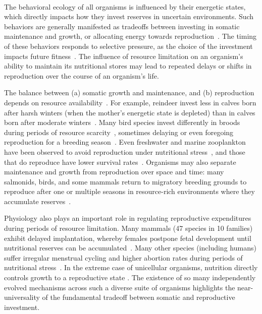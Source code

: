 \documentclass[twocolumn,preprintnumbers,amsmath,amssymb,superscriptaddress]{revtex4}
\begin{document}
\maketitle



\\
The behavioral ecology of all organisms is influenced by their energetic
states, which directly impacts how they invest reserves in uncertain
environments.  Such behaviors are generally manifested as tradeoffs between
investing in somatic maintenance and growth, or allocating energy towards
reproduction~\citep{Martin:1987dl,Kirk:1997cc,Kempes:2012hy}.  The timing of
these behaviors responds to selective pressure, as the choice of the
investment impacts future
fitness~\citep{Mangel:1988uaa,Mangel:2014kz,Yeakel:2013hi}.  The influence of
resource limitation on an organism's ability to maintain its nutritional
stores may lead to repeated delays or shifts in reproduction over the course
of an organism's life.

The balance between (a) somatic growth and maintenance, and (b) reproduction depends on resource availability~\citep{Morris:1987eo}.
For example, reindeer invest less in calves born after harsh winters (when the mother's energetic state is depleted) than in calves born after moderate winters~\citep{Tveraa:2003fq}.
Many bird species invest differently in broods during periods of resource scarcity~\citep{Daan:1988va,Jacot:2009dv}, sometimes delaying or even foregoing reproduction for a breeding season~\citep{Martin:1987dl,Stearns:1989ip,Barboza:2002in}.
Even freshwater and marine zooplankton have been observed to avoid reproduction under nutritional stress~\citep{Threlkeld:1976ih}, and those that do reproduce have lower survival rates~\citep{Kirk:1997cc}.
Organisms may also separate maintenance and growth from reproduction over space and time: many salmonids, birds, and some mammals return to migratory breeding grounds to reproduce after one or multiple seasons in resource-rich environments where they accumulate reserves~\citep{Weber:1998jg,Mduma:1999cp,Moore:2014hi}.

Physiology also plays an important role in regulating reproductive expenditures during periods of resource limitation.
Many mammals (47 species in 10 families) exhibit delayed implantation, whereby females postpone fetal development until nutritional reserves can be accumulated~\citep{Mead:1989dt,Sandell:1990kw}.
Many other species (including humans) suffer irregular menstrual cycling and higher abortion rates during periods of nutritional stress~\citep{Bulik:1999eo,Trites:2003cc}.
In the extreme case of unicellular organisms, nutrition directly controls growth to a reproductive state \citep{Glazier:2009hq,Kempes:2012hy}. The existence of so many independently evolved mechanisms across such a diverse suite of organisms highlights the near-universality of the fundamental tradeoff between somatic and reproductive investment.
\end{document}
